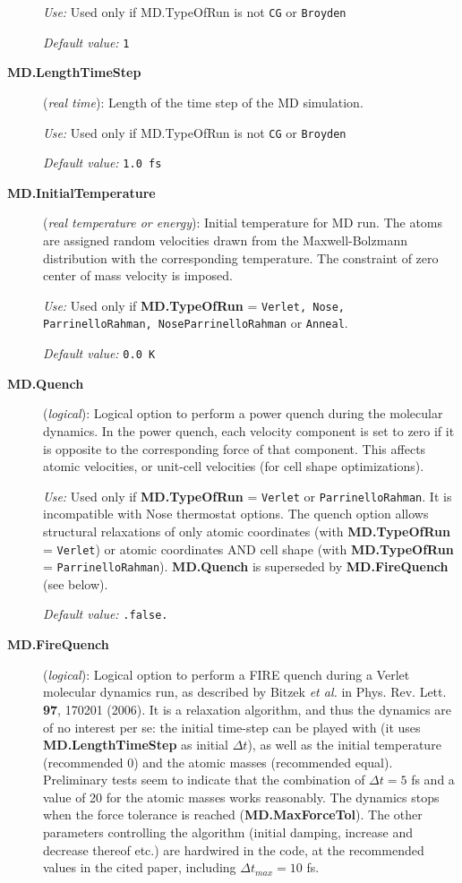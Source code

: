 \documentclass[11pt]{article}
\begin{document}
\begin{description}
{\it Use:} Used only if MD.TypeOfRun is not {\tt CG} or {\tt Broyden}
    
{\it Default value:} {\tt 1}

\item[{\bf MD.LengthTimeStep}] ({\it real time}): 
Length of the time step of the MD simulation.

{\it Use:} Used only if MD.TypeOfRun is not {\tt CG} or {\tt Broyden}
    
{\it Default value:} {\tt 1.0 fs}

\item[{\bf MD.InitialTemperature}] ({\it real temperature or energy}): 
Initial temperature for MD run. The atoms are assigned random 
velocities drawn from the Maxwell-Bolzmann distribution with the
corresponding temperature. The constraint of zero center of
mass velocity is imposed.

{\it Use:} Used only if {\bf MD.TypeOfRun} = {\tt Verlet, Nose, 
ParrinelloRahman, NoseParrinelloRahman}
or {\tt Anneal}.

{\it Default value:} {\tt 0.0 K}

\item[{\bf MD.Quench}] ({\it logical}): 
Logical option to perform a power quench during the molecular dynamics. 
In the power quench, each velocity component is set to
zero if it is opposite to the corresponding force
of that component. This affects atomic velocities,
or unit-cell velocities (for cell shape optimizations).

{\it Use:} Used only if {\bf MD.TypeOfRun} = {\tt Verlet} or 
{\tt ParrinelloRahman}.
It is incompatible with Nose thermostat options.
The quench option allows structural relaxations of
only atomic coordinates (with {\bf MD.TypeOfRun} = {\tt Verlet})
or atomic coordinates AND cell shape 
(with {\bf MD.TypeOfRun} = {\tt ParrinelloRahman}).
{\bf MD.Quench} is superseded by {\bf MD.FireQuench} (see below).

{\it Default value:} {\tt .false.}

\item[{\bf MD.FireQuench}] ({\it logical}): 
Logical option to perform a FIRE quench during a Verlet molecular dynamics
run, as described by Bitzek {\it et al.} in Phys. Rev. Lett. {\bf 97},
170201 (2006). It is a relaxation algorithm, and thus the dynamics
are of no interest per se: the initial time-step can be played with
(it uses {\bf MD.LengthTimeStep} as initial $\Delta t$),
as well as the initial temperature (recommended 0) and the atomic
masses (recommended equal). Preliminary tests seem to indicate that 
the combination of $\Delta t = 5$ fs and a value of 20 for the atomic 
masses works reasonably. The dynamics stops when the force
tolerance is reached ({\bf MD.MaxForceTol}). The other
parameters controlling the algorithm (initial damping, 
increase and decrease thereof etc.) are hardwired in the code,
at the recommended values in the cited paper,
including $\Delta t_{max} = 10$ fs.


\end{description}
\end{document}
